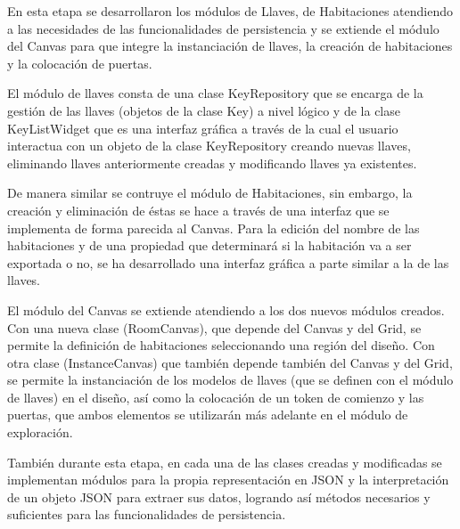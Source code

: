 En esta etapa se desarrollaron los módulos de Llaves, de Habitaciones atendiendo a las necesidades de las funcionalidades de persistencia y se extiende el módulo del Canvas para que integre la instanciación de llaves, la creación de habitaciones y la colocación de puertas.

El módulo de llaves consta de una clase KeyRepository que se encarga de la gestión de las llaves (objetos de la clase Key) a nivel lógico y de la clase KeyListWidget que es una interfaz gráfica a través de la cual el usuario interactua con un objeto de la clase KeyRepository creando nuevas llaves, eliminando llaves anteriormente creadas y modificando llaves ya existentes.

De manera similar se contruye el módulo de Habitaciones, sin embargo, la creación y eliminación de éstas se hace a través de una interfaz que se implementa de forma parecida al Canvas. Para la edición del nombre de las habitaciones y de una propiedad que determinará si la habitación va a ser exportada o no, se ha desarrollado una interfaz gráfica a parte similar a la de las llaves.

El módulo del Canvas se extiende atendiendo a los dos nuevos módulos creados.
Con una nueva clase (RoomCanvas), que depende del Canvas y del Grid, se permite la definición de habitaciones seleccionando una región del diseño.
Con otra clase (InstanceCanvas) que también depende también del Canvas y del Grid, se permite la instanciación de los modelos de llaves (que se definen con el módulo de llaves) en el diseño, así como la colocación de un token de comienzo y las puertas, que ambos elementos se utilizarán más adelante en el módulo de exploración.

También durante esta etapa, en cada una de las clases creadas y modificadas se implementan módulos para la propia representación en JSON y la interpretación de un objeto JSON para extraer sus datos, logrando así métodos necesarios y suficientes para las funcionalidades de persistencia.